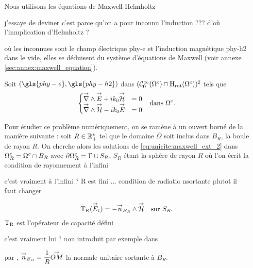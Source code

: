   Nous utilisons les équations de Maxwell-Helmholtz
  \begin{REM}
  j'essaye de deviner c'est parce qu'on a pour inconnu l'induction ??? d'où l'inmplication d'Helmholtz ?
\end{REM} où les inconnues sont le champ électrique \gls{phy-e} et l'induction magnétique \gls{phy-h2} dans le vide, elles se déduisent du système d'équations de Maxwell (voir annexe \ref{sec:annex:maxwell_equation}). 

  Soit \((\gls{phy-e},\gls{phy-h2})\) dans \((\mathcal{C}_0^\infty(\Omega^c)\cap\mathrm{H}_\mathrm{rot}(\Omega^c))^2\) tels que
  \begin{align}
  \left\lbrace
    \begin{matrix}
      {\overset{\rightarrow}{\nabla}}\wedge {\overset{\rightarrow}{E}} + i k_0 {\overset{\rightarrow}{\mathcal{H}}} &= 0
      \\
      {\overset{\rightarrow}{\nabla}}\wedge {\overset{\rightarrow}{\mathcal{H}}} - i k_0 {\overset{\rightarrow}{E}} &= 0
    \end{matrix}
    \right. && \text{dans \(\Omega^c\).}
    \label{eq:unicite:maxwell_ext_2}
  \end{align}


  Pour étudier ce problème numériquement, on se ramène à un ouvert borné de la manière suivante : soit \(R\in\mathbb R_+^*\) tel que le domaine \(\overline{\Omega}\) soit inclus dans \(B_R\), la boule de rayon \(R\).
  On cherche alors les solutions de \eqref{eq:unicite:maxwell_ext_2} dans \(\Omega^c_R=\Omega^c\cap B_R\) avec \(\partial\Omega^c_R = \Gamma\cup S_R\), \(S_R\) étant la sphère de rayon \(R\) où l'on écrit la condition de rayonnement à l'infini
  \begin{REM}
  c'est vraiment à l'infini ? R est fini ... condition de radiatio nsortante plutot il faut changer
\end{REM}
  \begin{equation}
    \label{eq:unicite:TR}
    \begin{aligned}
      \operatorname{T_R}({\overset{\rightarrow}{E}}_t) = - {\overset{\rightarrow}{n}}_{B_R} \wedge {\overset{\rightarrow}{\mathcal{H}}} && \text{sur \(S_R\).}
    \end{aligned}
  \end{equation}
  \(\operatorname{T_R}\) est l'opérateur de capacité défini
  \begin{REM}
  c'est vraiment lui ? non introduit par exemple dans
\end{REM} par \cite[p.~200]{nedelec_acoustic_2001}, \({\overset{\rightarrow}{n}}_{B_R}=\dfrac{1}{R}{\overset{\rightarrow}{OM}}\) la normale unitaire sortante à \(B_R\).

